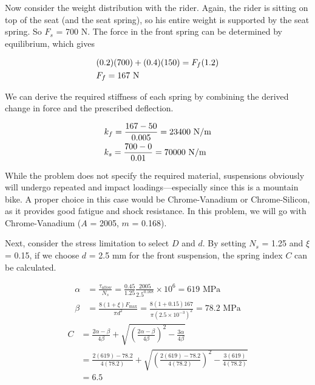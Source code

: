 \documentclass[a4paper,openany,12pt]{book}
\begin{document}
{{Now consider the weight distribution with the rider. Again, the rider is
sitting on top of the seat (and the seat spring), so his entire weight
is supported by the seat spring. So \(F_s\) = 700 N. The force in the
front spring can be determined by equilibrium, which gives

$$\begin{gathered}
      (0.2)(700) + (0.4)(150) = F_f(1.2) \hfill \\
      F_f = 167 \text{ N} \hfill \\ 
    \end{gathered}$$

We can derive the required stiffness of each spring by combining the
derived change in force and the prescribed deflection.

$$\begin{gathered}
      k_f = \frac{167 - 50}{0.005} = 23400 \text{ N/m} \hfill \\
      k_s = \frac{700 - 0}{0.01} = 70000 \text{ N/m} \hfill \\ 
    \end{gathered}$$

While the problem does not specify the required material, suspensions
obviously will undergo repeated and impact loadings---especially since
this is a mountain bike. A proper choice in this case would be
Chrome-Vanadium or Chrome-Silicon, as it provides good fatigue and shock
resistance. In this problem, we will go with Chrome-Vanadium (\(A\) =
2005, \(m\) = 0.168).

Next, consider the stress limitation to select \(D\) and \(d\). By setting
\(N_s\) = 1.25 and \(\xi\) = 0.15, if we choose \(d\) = 2.5 mm for the front
suspension, the spring index \(C\) can be calculated.

$$\begin{aligned}
    \alpha  &= \frac{\tau _{allow}}{N_s} = \frac{0.45}{1.25}\frac{2005}{2.5^{0.168}} \times 10^6 = 619 \text{ MPa} \\ 
    \beta  &= \frac{8(1 + \xi )F_{\max}}{\pi d^2} = \frac{8(1 + 0.15)167}{\pi (2.5 \times 10^{-3})^2} = 78.2 \text{ MPa}
  \end{aligned}$$ $$\begin{aligned}
    C &= \frac{2\alpha  - \beta}{4\beta} + \sqrt {\left( \frac{2\alpha  - \beta}{4\beta} \right)^2 - \frac{3\alpha}{4\beta}}  \\ 
      & = \frac{2(619) - 78.2}{4(78.2)} + \sqrt {\left( \frac{2(619) - 78.2}{4(78.2)} \right)^2 - \frac{3(619)}{4(78.2)}}  \\ 
      &= 6.5 
  \end{aligned}$$

}}
\end{document}
